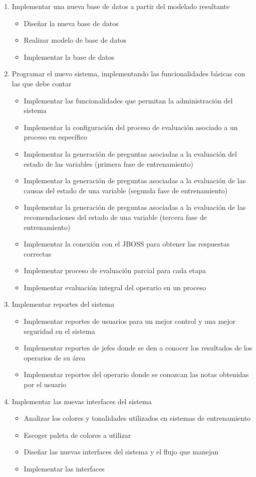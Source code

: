 \begin{itemize}
\begin{enumerate}
\item Implementar una nueva base de datos a partir del modelado resultante
\begin{itemize}
\item Diseñar la nueva base de datos
\item Realizar modelo de base de datos
\item Implementar la base de datos
\end{itemize}

\item Programar el nuevo sistema, implementando las funcionalidades básicas con las que debe contar
\begin{itemize}
\item Implementar las funcionalidades que permitan la administración del sistema
\item Implementar la configuración del proceso de evaluación asociado a un proceso en específico
\item Implementar la generación de preguntas asociadas a la evaluación del estado de las variables (primera fase de entrenamiento)
\item Implementar la generación de preguntas asociadas a la evaluación de las causas del estado de una variable (segunda fase de entrenamiento)
\item Implementar la generación de preguntas asociadas a la evaluación de las recomendaciones del estado de una variable (tercera fase de entrenamiento)
\item Implementar la conexión con el JBOSS para obtener las respuestas correctas
\item Implementar proceso de evaluación parcial para cada etapa
\item Implementar evaluación integral del operario en un proceso
\end{itemize}

\item Implementar reportes del sistema
\begin{itemize}
\item Implementar reportes de usuarios para un mejor control y una mejor seguridad en el sistema
\item Implementar reportes de jefes donde se den a conocer los resultados de los operarios de su área
\item Implementar reportes del operario donde se conozcan las notas obtenidas por el usuario
\end{itemize}

\item Implementar las nuevas interfaces del sistema
\begin{itemize}
\item Analizar los colores y tonalidades utilizados en sistemas de entrenamiento 
\item Escoger paleta de colores a utilizar
\item Diseñar las nuevas interfaces del sistema y el flujo que manejan
\item Implementar las interfaces
\end{itemize}


\end{enumerate}
\end{itemize}
